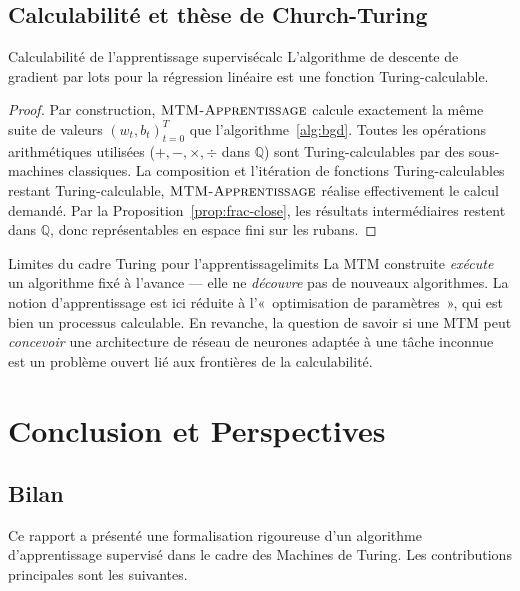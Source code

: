 \documentclass[12pt, a4paper, oneside]{report}
\newcommand{\mtmlong}{\textsc{MTM-Apprentissage}}
\begin{document}
\section{Calculabilité et thèse de Church-Turing}

\begin{thm}{Calculabilité de l'apprentissage supervisé}{calc}
  L'algorithme de descente de gradient par lots pour la régression linéaire est une fonction Turing-calculable.
\end{thm}

\begin{proof}
  Par construction, $\mtmlong$ calcule exactement la même suite de valeurs $(w_t, b_t)_{t=0}^T$ que l'algorithme~\ref{alg:bgd}. Toutes les opérations arithmétiques utilisées ($+, -, \times, \div$ dans $\mathbb{Q}$) sont Turing-calculables par des sous-machines classiques. La composition et l'itération de fonctions Turing-calculables restant Turing-calculable, $\mtmlong$ réalise effectivement le calcul demandé. Par la Proposition~\ref{prop:frac-close}, les résultats intermédiaires restent dans $\mathbb{Q}$, donc représentables en espace fini sur les rubans.
\end{proof}

\begin{rmk}{Limites du cadre Turing pour l'apprentissage}{limits}
  La MTM construite \emph{exécute} un algorithme fixé à l'avance — elle ne \emph{découvre} pas de nouveaux algorithmes. La notion d'apprentissage est ici réduite à l'«~optimisation de paramètres~», qui est bien un processus calculable. En revanche, la question de savoir si une MTM peut \emph{concevoir} une architecture de réseau de neurones adaptée à une tâche inconnue est un problème ouvert lié aux frontières de la calculabilité.
\end{rmk}

\chapter{Conclusion et Perspectives}

\section{Bilan}

Ce rapport a présenté une formalisation rigoureuse d'un algorithme d'apprentissage supervisé dans le cadre des Machines de Turing. Les contributions principales sont les suivantes.
\end{document}
